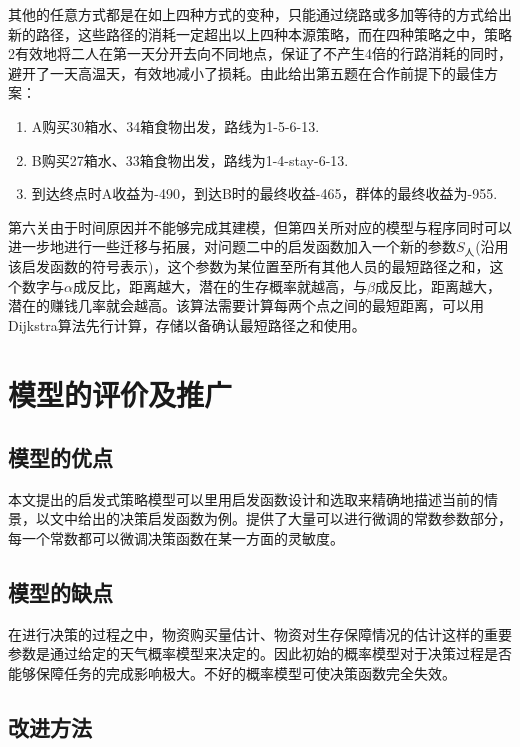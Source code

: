 \documentclass[a4paper]{ctexart}
\begin{document}
其他的任意方式都是在如上四种方式的变种，只能通过绕路或多加等待的方式给出新的路径，这些路径的消耗一定超出以上四种本源策略，而在四种策略之中，策略2有效地将二人在第一天分开去向不同地点，保证了不产生4倍的行路消耗的同时，避开了一天高温天，有效地减小了损耗。由此给出第五题在合作前提下的最佳方案：
\begin{enumerate}
    \item A购买30箱水、34箱食物出发，路线为1-5-6-13.
    \item B购买27箱水、33箱食物出发，路线为1-4-stay-6-13.
    \item 到达终点时A收益为-490，到达B时的最终收益-465，群体的最终收益为-955.
\end{enumerate}

第六关由于时间原因并不能够完成其建模，但第四关所对应的模型与程序同时可以进一步地进行一些迁移与拓展，对问题二中的启发函数加入一个新的参数$S_{人}$(沿用该启发函数的符号表示)，这个参数为某位置至所有其他人员的最短路径之和，这个数字与$\alpha$成反比，距离越大，潜在的生存概率就越高，与$\beta$成反比，距离越大，潜在的赚钱几率就会越高。该算法需要计算每两个点之间的最短距离，可以用Dijkstra算法先行计算，存储以备确认最短路径之和使用。

\section{模型的评价及推广}

\subsection{模型的优点}

本文提出的启发式策略模型可以里用启发函数设计和选取来精确地描述当前的情景，以文中给出的决策启发函数为例。提供了大量可以进行微调的常数参数部分，每一个常数都可以微调决策函数在某一方面的灵敏度。

\subsection{模型的缺点}

在进行决策的过程之中，物资购买量估计、物资对生存保障情况的估计这样的重要参数是通过给定的天气概率模型来决定的。因此初始的概率模型对于决策过程是否能够保障任务的完成影响极大。不好的概率模型可使决策函数完全失效。

\subsection{改进方法}
\end{document}
